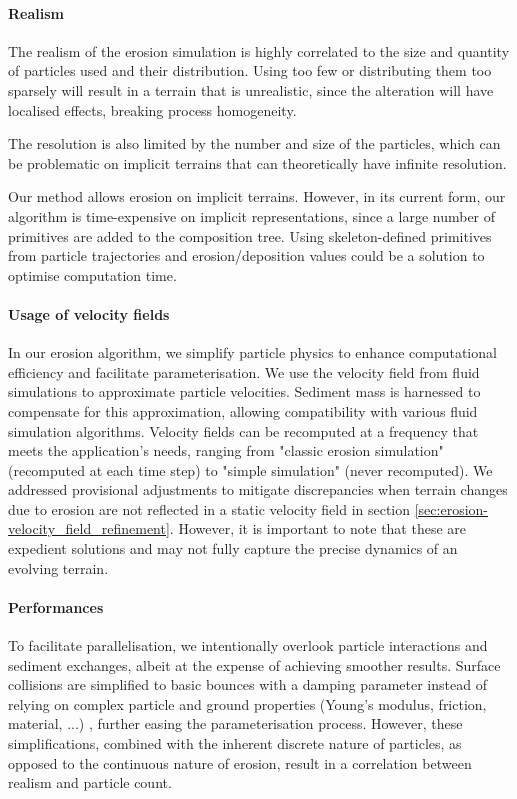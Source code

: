 \paragraph{Realism}
The realism of the erosion simulation is highly correlated to the size and quantity of particles used and their distribution. Using too few or distributing them too sparsely will result in a terrain that is unrealistic, since the alteration will have localised effects, breaking process homogeneity.

The resolution is also limited by the number and size of the particles, which can be problematic on implicit terrains that can theoretically have infinite resolution.

Our method allows erosion on implicit terrains. However, in its current form, our algorithm is time-expensive on implicit representations, since a large number of primitives are added to the composition tree. Using skeleton-defined primitives \cite{Hong2013, Rigaudiere2000} from particle trajectories and erosion/deposition values could be a solution to optimise computation time.

\paragraph{Usage of velocity fields}
In our erosion algorithm, we simplify particle physics to enhance computational efficiency and facilitate parameterisation. We use the velocity field from fluid simulations to approximate particle velocities. Sediment mass is harnessed to compensate for this approximation, allowing compatibility with various fluid simulation algorithms. Velocity fields can be recomputed at a frequency that meets the application's needs, ranging from "classic erosion simulation" (recomputed at each time step) to "simple simulation" (never recomputed). We addressed provisional adjustments to mitigate discrepancies when terrain changes due to erosion are not reflected in a static velocity field in section \cref{sec:erosion-velocity_field_refinement}. However, it is important to note that these are expedient solutions and may not fully capture the precise dynamics of an evolving terrain.

\paragraph{Performances}
To facilitate parallelisation, we intentionally overlook particle interactions and sediment exchanges, albeit at the expense of achieving smoother results. Surface collisions are simplified to basic bounces with a damping parameter instead of relying on complex particle and ground properties (Young's modulus, friction, material, ...) \cite{Yan2020}, further easing the parameterisation process. However, these simplifications, combined with the inherent discrete nature of particles, as opposed to the continuous nature of erosion, result in a correlation between realism and particle count.

